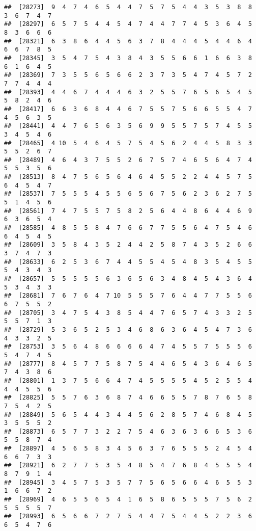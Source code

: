 \documentclass[
]{book}
\begin{document}
\begin{verbatim}
##  [28273]  9  4  7  4  6  5  4  4  7  5  7  5  4  4  3  5  3  8  8  3  6  7  4  7
##  [28297]  6  5  7  5  4  4  5  4  7  4  4  7  7  4  5  3  6  4  5  8  3  6  6  6
##  [28321]  6  3  8  6  4  4  5  6  3  7  8  4  4  4  5  4  4  6  4  6  6  7  8  5
##  [28345]  3  5  4  7  5  4  3  8  4  3  5  5  6  6  1  6  6  3  8  6  1  6  4  5
##  [28369]  7  3  5  5  6  5  6  6  2  3  7  3  5  4  7  4  5  7  2  7  7  4  4  4
##  [28393]  4  4  6  7  4  4  4  6  3  2  5  5  7  6  5  6  5  4  5  5  8  2  4  6
##  [28417]  6  6  3  6  8  4  4  6  7  5  5  7  5  6  6  5  5  4  7  4  5  6  3  5
##  [28441]  4  4  7  6  5  6  3  5  6  9  9  5  5  7  5  7  4  5  5  3  4  5  4  6
##  [28465]  4 10  5  4  6  4  5  7  5  4  5  6  2  4  4  5  8  3  3  5  5  2  6  7
##  [28489]  4  6  4  3  7  5  5  2  6  7  5  7  4  6  5  6  4  7  4  5  5  3  5  6
##  [28513]  8  4  7  5  6  5  6  4  6  4  5  5  2  2  4  4  5  7  5  6  4  5  4  7
##  [28537]  7  5  5  5  4  5  5  6  5  6  7  5  6  2  3  6  2  7  5  5  1  4  5  6
##  [28561]  7  4  7  5  5  7  5  8  2  5  6  4  4  8  6  4  4  6  9  6  3  6  5  4
##  [28585]  4  8  5  5  8  4  7  6  6  7  7  5  5  6  4  7  5  4  6  6  4  5  4  5
##  [28609]  3  5  8  4  3  5  2  4  4  2  5  8  7  4  3  5  2  6  6  3  7  4  7  3
##  [28633]  6  2  5  3  6  7  4  4  5  5  4  5  4  8  3  5  4  5  5  5  4  3  4  3
##  [28657]  5  5  5  5  5  6  3  6  5  6  3  4  8  4  5  4  3  6  4  5  3  4  3  3
##  [28681]  7  6  7  6  4  7 10  5  5  5  7  6  4  4  7  7  5  5  6  6  7  5  5  2
##  [28705]  3  4  7  5  4  3  8  5  4  4  7  6  5  7  4  3  3  2  5  5  5  7  1  3
##  [28729]  5  3  6  5  2  5  3  4  6  8  6  3  6  4  5  4  7  3  6  4  3  3  2  5
##  [28753]  3  5  6  4  8  6  6  6  6  4  7  4  5  5  7  5  5  5  6  5  4  7  4  5
##  [28777]  8  4  5  7  7  5  8  7  5  4  4  6  5  4  3  6  4  6  5  7  4  3  8  6
##  [28801]  1  3  7  5  6  6  4  7  4  5  5  5  5  4  5  2  5  5  4  4  4  5  5  6
##  [28825]  5  5  7  6  3  6  8  7  4  6  6  5  5  7  8  7  6  5  8  7  5  4  2  5
##  [28849]  5  6  5  4  4  3  4  4  5  6  2  8  5  7  4  6  8  4  5  3  5  5  5  2
##  [28873]  6  5  7  7  3  2  2  7  5  4  6  3  6  3  6  6  5  3  6  5  5  8  7  4
##  [28897]  4  5  6  5  8  3  4  5  6  3  7  6  5  5  5  2  4  5  4  6  6  7  3  3
##  [28921]  6  2  7  7  5  3  5  4  8  5  4  7  6  8  4  5  5  5  4  8  7  9  1  4
##  [28945]  3  4  5  7  5  3  5  7  7  5  6  5  6  6  4  6  5  5  3  1  6  6  7  2
##  [28969]  4  6  5  5  6  5  4  1  6  5  8  6  5  5  5  7  5  6  2  5  5  5  5  7
##  [28993]  6  5  6  6  7  2  7  5  4  4  7  5  4  4  5  2  2  3  6  6  5  4  7  6

\end{verbatim}
\end{document}
